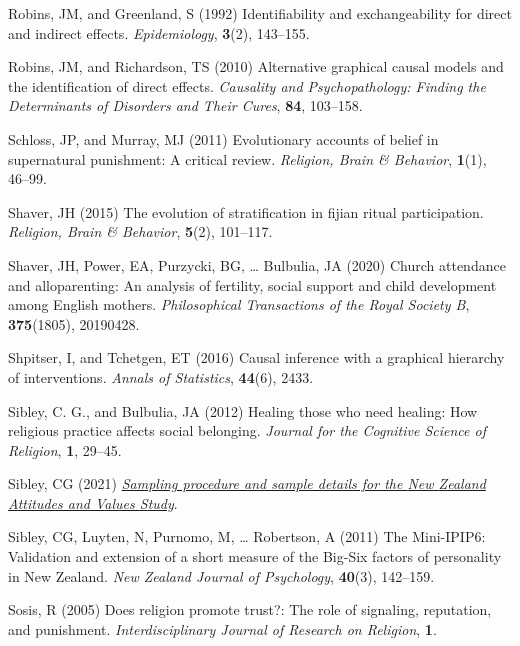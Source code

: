 \documentclass[
  single column]{article}
\newlength{\cslhangindent}
\newenvironment{CSLReferences}[2] %
 {\begin{list}{}{%
  \setlength{\itemindent}{0pt}
  \setlength{\leftmargin}{0pt}
  \setlength{\parsep}{0pt}
  \ifodd #1
   \setlength{\leftmargin}{\cslhangindent}
   \setlength{\itemindent}{-1\cslhangindent}
  \fi
  \setlength{\itemsep}{#2\baselineskip}}}
 {\end{list}}
\begin{document}
\begin{CSLReferences}{1}{0}
Robins, JM, and Greenland, S (1992) Identifiability and exchangeability
for direct and indirect effects. \emph{Epidemiology}, \textbf{3}(2),
143--155.

Robins, JM, and Richardson, TS (2010) Alternative graphical causal
models and the identification of direct effects. \emph{Causality and
Psychopathology: Finding the Determinants of Disorders and Their Cures},
\textbf{84}, 103--158.

Schloss, JP, and Murray, MJ (2011) Evolutionary accounts of belief in
supernatural punishment: A critical review. \emph{Religion, Brain \&
Behavior}, \textbf{1}(1), 46--99.

Shaver, JH (2015) The evolution of stratification in fijian ritual
participation. \emph{Religion, Brain \& Behavior}, \textbf{5}(2),
101--117.

Shaver, JH, Power, EA, Purzycki, BG, \ldots{} Bulbulia, JA (2020) Church
attendance and alloparenting: An analysis of fertility, social support
and child development among {E}nglish mothers. \emph{Philosophical
Transactions of the Royal Society B}, \textbf{375}(1805), 20190428.

Shpitser, I, and Tchetgen, ET (2016) Causal inference with a graphical
hierarchy of interventions. \emph{Annals of Statistics}, \textbf{44}(6),
2433.

Sibley, C. G., and Bulbulia, JA (2012) Healing those who need healing:
How religious practice affects social belonging. \emph{Journal for the
Cognitive Science of Religion}, \textbf{1}, 29--45.

Sibley, CG (2021)
\emph{\href{https://doi.org/10.31234/osf.io/wgqvy}{Sampling procedure
and sample details for the {N}ew {Z}ealand {A}ttitudes and {V}alues
{S}tudy}}.

Sibley, CG, Luyten, N, Purnomo, M, \ldots{} Robertson, A (2011) The
Mini-IPIP6: Validation and extension of a short measure of the Big-Six
factors of personality in {N}ew {Z}ealand. \emph{New Zealand Journal of
Psychology}, \textbf{40}(3), 142--159.

Sosis, R (2005) Does religion promote trust?: The role of signaling,
reputation, and punishment. \emph{Interdisciplinary Journal of Research
on Religion}, \textbf{1}.


\end{CSLReferences}
\end{document}
